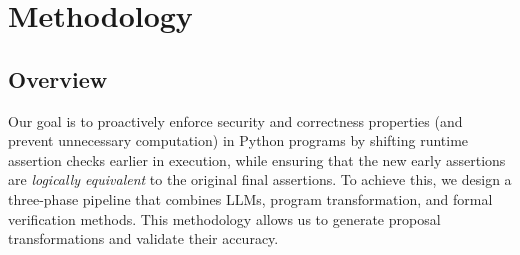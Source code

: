 \documentclass[8pt]{extarticle}
\begin{document}


\section{Methodology}
\subsection{Overview}

Our goal is to proactively enforce security and correctness properties (and prevent unnecessary computation) in Python programs by shifting runtime assertion checks earlier in execution, while ensuring that the new early assertions are \textit{logically equivalent} to the original final assertions. To achieve this, we design a three-phase pipeline that combines LLMs, program transformation, and formal verification methods. This methodology allows us to generate proposal transformations and validate their accuracy.
\end{document}
